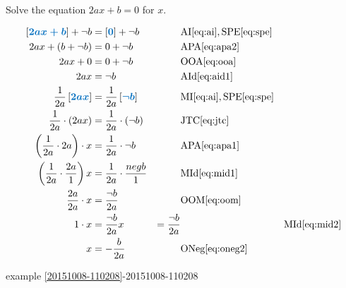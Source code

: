 \documentclass[20150903-160354-rs2.2-MarksMathNotebook.tex]{subfiles}
\begin{document}
\begin{example}[id:20151015-104754] \label{20151015-104754} \hfill \\
Solve the equation $2ax+b=0$ for $x$.

\soln

\solnsteps
\begin{align*}
\farg{2ax+b} + \neg b&= \farg{0} + \neg b && \text{AI} \eqref{eq:ai},\text{SPE} \eqref{eq:spe}  \\
2ax + (b + \neg b) &= 0 + \neg b && \text{APA} \eqref{eq:apa2} \\
2ax + 0 &= 0 + \neg b && \text{OOA} \eqref{eq:ooa} \\
2ax &= \neg b && \text{AId} \eqref{eq:aid1} \\
\dfrac{1}{2a} \farg{2ax} &= \dfrac{1}{2a} \farg{\neg b}  && \text{MI} \eqref{eq:ai},\text{SPE} \eqref{eq:spe}  \\
\dfrac{1}{2a} \cdot (2ax) &= \dfrac{1}{2a} \cdot (\neg b)  && \text{JTC} \eqref{eq:jtc} \\
\left(\dfrac{1}{2a} \cdot 2a \right) \cdot x &= \dfrac{1}{2a} \cdot \neg b && \text{APA} \eqref{eq:apa1} \\ 
\left(\dfrac{1}{2a} \cdot \dfrac{2a}{1} \right) x &= \dfrac{1}{2a} \cdot \dfrac{neg b}{1} && \text{MId} \eqref{eq:mid1} \\
\dfrac{2a}{2a} \cdot x &= \dfrac{\neg b}{2a} && \text{OOM} \eqref{eq:oom} \\
1 \cdot x &= \dfrac{\neg b}{2a} %
x &= \dfrac{\neg b}{2a} && \text{MId} \eqref{eq:mid2} \\
x &= - \dfrac{b}{2a} && \text{ONeg} \eqref{eq:oneg2} \\ 
\end{align*}

\qdepend

\qdependlist
example \ref{20151008-110208}-20151008-110208

\end{example}
\end{document}
